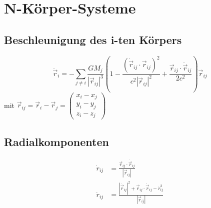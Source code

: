\section{N-Körper-Systeme}

\subsection*{Beschleunigung des i-ten Körpers}
\begin{equation}
\ddot{\vec{r}}_i = -\sum_{j\neq i} \frac{GM_j}{|\vec{r}_{ij}|^3} \left(
1 - \frac{(\dot{\vec{r}}_{ij}\cdot\vec{r}_{ij})^2}{c^2|\vec{r}_{ij}|^2} + \frac{\vec{r}_{ij}\cdot\ddot{\vec{r}}_{ij}}{2c^2}
\right) \vec{r}_{ij}
\end{equation}
mit \(\vec{r}_{ij} = \vec{r}_i - \vec{r}_j = \begin{pmatrix} x_i-x_j \\ y_i-y_j \\ z_i-z_j \end{pmatrix}\)

\subsection*{Radialkomponenten}
\begin{align}
\dot{r}_{ij} &= \frac{\vec{r}_{ij}\cdot\dot{\vec{r}}_{ij}}{|\vec{r}_{ij}|} \\
\ddot{r}_{ij} &= \frac{|\dot{\vec{r}}_{ij}|^2 + \vec{r}_{ij}\cdot\ddot{\vec{r}}_{ij} - \dot{r}_{ij}^2}{|\vec{r}_{ij}|}
\end{align}